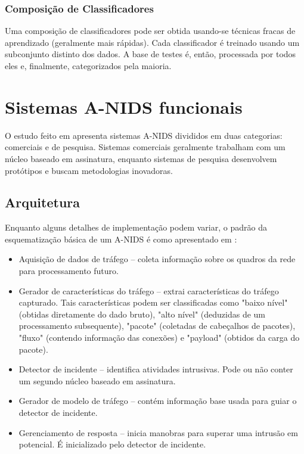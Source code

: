  \subsection{Composição de Classificadores}
    Uma composição de classificadores pode ser obtida usando-se técnicas fracas de aprendizado
    (geralmente mais rápidas). Cada classificador é treinado usando um subconjunto distinto dos dados.
    A base de testes é, então, processada por todos eles e, finalmente, categorizados pela maioria.


\chapter{Sistemas A-NIDS funcionais}
    O estudo feito em \cite{teodoro09} apresenta sistemas A-NIDS divididos em duas categorias: comerciais e de pesquisa.
    Sistemas comerciais geralmente trabalham com um núcleo baseado em assinatura, enquanto sistemas de pesquisa
    desenvolvem protótipos e buscam metodologias inovadoras.

 \section{Arquitetura}
    Enquanto alguns detalhes de implementação podem variar, o padrão da esquematização básica de um A-NIDS
    é como apresentado em \cite{catania12}:
    \begin{itemize}
        \item Aquisição de dados de tráfego -- coleta informação sobre os quadros da rede para processamento futuro.
        \item Gerador de características do tráfego -- extrai características do tráfego capturado. Tais características
         podem ser classificadas como "baixo nível" (obtidas diretamente do dado bruto), "alto nível" (deduzidas de um
         processamento subsequente), "pacote" (coletadas de cabeçalhos de pacotes), "fluxo" (contendo informação das
         conexões) e "payload" (obtidos da carga do pacote).
        \item Detector de incidente -- identifica atividades intrusivas. Pode ou não conter um segundo núcleo baseado
        em assinatura.
        \item Gerador de modelo de tráfego -- contém informação base usada para guiar o detector de incidente.
        \item Gerenciamento de resposta -- inicia manobras para superar uma intrusão em potencial. É inicializado pelo
        detector de incidente.
    \end{itemize}

